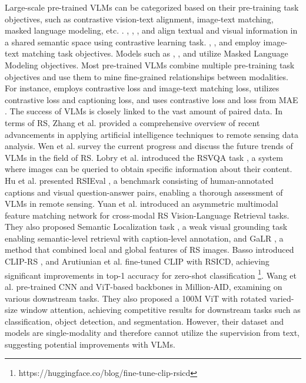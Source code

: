 \documentclass[journal]{IEEEtran}
\begin{document}
Large-scale pre-trained VLMs can be categorized based on their pre-training task objectives, such as contrastive vision-text alignment, image-text matching, masked language modeling, etc. \cite{du2022survey}. \cite{clip}, \cite{align}, \cite{filip}, and \cite{declip} align textual and visual information in a shared semantic space using contrastive learning task. \cite{uniter}, \cite{albef}, and \cite{blip} employ image-text matching task objectives. Models such as \cite{oscar}, \cite{flip}, and \cite{beit3} utilize Masked Language Modeling objectives. Most pre-trained VLMs combine multiple pre-training task objectives and use them to mine fine-grained relationships between modalities. For instance, \cite{albef} employs contrastive loss and image-text matching loss, \cite{coca} utilizes contrastive loss and captioning loss, and \cite{flip} uses contrastive loss and loss from MAE \cite{mae}. The success of VLMs is closely linked to the vast amount of paired data. In terms of RS, Zhang et al.\cite{airs} provided a comprehensive overview of recent advancements in applying artificial intelligence techniques to remote sensing data analysis. Wen et al. \cite{wen2023visionlanguage} survey the current progress and discuss the future trends of VLMs in the field of RS. Lobry et al. introduced the RSVQA task \cite{rsvqa}, a system where images can be queried to obtain specific information about their content. Hu et al. presented RSIEval \cite{hu2023rsgpt}, a benchmark consisting of human-annotated captions and visual question-answer pairs, enabling a thorough assessment of VLMs in remote sensing. Yuan et al. \cite{RSITMD} introduced an asymmetric multimodal feature matching network for cross-modal RS Vision-Language Retrieval tasks. They also proposed Semantic Localization task \cite{selo}, a weak visual grounding task enabling semantic-level retrieval with caption-level annotation, and GaLR \cite{galr}, a method that combined local and global features of RS images. Basso introduced CLIP-RS \cite{clip-rs}, and Arutiunian et al. fine-tuned CLIP with RSICD, achieving significant improvements in top-1 accuracy for zero-shot classification \footnote{https://huggingface.co/blog/fine-tune-clip-rsicd}. Wang et al. pre-trained CNN and ViT-based backbones \cite{rsp} in Million-AID, examining on various downstream tasks. They also proposed a 100M ViT with rotated varied-size window attention, achieving competitive results for downstream tasks such as classification, object detection, and segmentation. However, their dataset and models are single-modality and therefore cannot utilize the supervision from text, suggesting potential improvements with VLMs.
\end{document}
